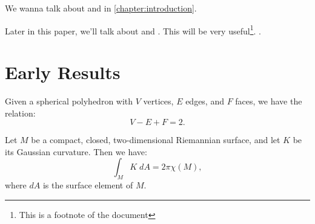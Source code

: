 %
%
We wanna talk about \cite{milnor1963groups} and \cite{milnor1956manifolds} in \autoref{chapter:introduction}. 

Later in this paper, we'll talk about \cite{milnor2000exotic} and \cite{dieck2008algebraic}. This will be very useful\footnote{This is a footnote of the document}. \cite{dieudonne2009history}.

\section{Early Results}

\begin{theorem}
	Given a spherical polyhedron with $V$ vertices, $E$ edges, and $F$ faces, we have the relation:
	\[
			V - E + F = 2.
	\]
\end{theorem}

\begin{theorem}
	Let $M$ be a compact, closed, two-dimensional Riemannian surface, and let $K$ be its Gaussian curvature. Then we have:
	\[
		\int_M K\; dA  = 2\pi \chi(M),
	\]
	where $dA$ is the surface element of $M$.
\end{theorem}

